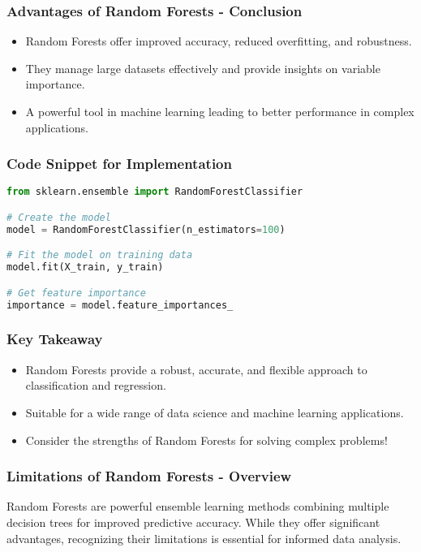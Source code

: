 \documentclass[aspectratio=169]{beamer}
\begin{document}
\begin{frame}[fragile]
    \frametitle{Advantages of Random Forests - Conclusion}
    \begin{itemize}
        \item Random Forests offer improved accuracy, reduced overfitting, and robustness.
        \item They manage large datasets effectively and provide insights on variable importance.
        \item A powerful tool in machine learning leading to better performance in complex applications.
    \end{itemize}
\end{frame}

\begin{frame}[fragile]
    \frametitle{Code Snippet for Implementation}
    \begin{lstlisting}[language=Python]
from sklearn.ensemble import RandomForestClassifier

# Create the model
model = RandomForestClassifier(n_estimators=100)

# Fit the model on training data
model.fit(X_train, y_train)

# Get feature importance
importance = model.feature_importances_
    \end{lstlisting}
\end{frame}

\begin{frame}[fragile]
    \frametitle{Key Takeaway}
    \begin{itemize}
        \item Random Forests provide a robust, accurate, and flexible approach to classification and regression.
        \item Suitable for a wide range of data science and machine learning applications.
        \item Consider the strengths of Random Forests for solving complex problems!
    \end{itemize}
\end{frame}

\begin{frame}[fragile]
    \frametitle{Limitations of Random Forests - Overview}
    Random Forests are powerful ensemble learning methods combining multiple decision trees for improved predictive accuracy. 
    While they offer significant advantages, recognizing their limitations is essential for informed data analysis.
\end{frame}
\end{document}
